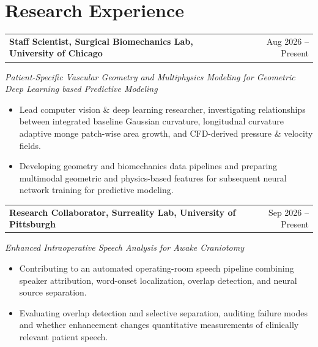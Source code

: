 \documentclass[letterpaper,10pt]{article}
\makeatletter
\newlength{\entrygap}
\newcommand{\cvProject}[2]{%
  \needspace{3\baselineskip}%
  \begin{tabularx}{\textwidth}{@{}X@{\hspace{0.5em}}r@{}}
    \textbf{#1} & {\small #2}
  \end{tabularx}\par\vspace{1pt}%
}
\newenvironment{cvitems}{%
  \begin{itemize}[leftmargin=0.17in,label=\textbullet,
    topsep=0pt,itemsep=2pt,parsep=0pt,partopsep=0pt]
  \normalsize
}{%
  \end{itemize}\vspace{\entrygap}%
}
\makeatother
\begin{document}
\section{Research Experience}
\cvProject{Staff Scientist\textnormal{, Surgical Biomechanics Lab, University of Chicago}}{Aug 2026 -- Present}
{\small\textit{Patient-Specific Vascular Geometry and Multiphysics Modeling for Geometric Deep Learning based Predictive Modeling}}\par\vspace{2pt}

\begin{cvitems}
  \item Lead computer vision \& deep learning researcher, investigating relationships between
        integrated baseline Gaussian curvature, longitudnal curvature adaptive monge patch-wise area
        growth, and CFD-derived pressure \& velocity fields.

  \item Developing geometry and biomechanics data pipelines and preparing multimodal geometric and physics-based features for subsequent neural network training for predictive modeling.
\end{cvitems}

\cvProject{Research Collaborator\textnormal{, Surreality Lab, University of Pittsburgh}}{Sep 2026 -- Present}
{\small\textit{Enhanced Intraoperative Speech Analysis for Awake Craniotomy}}\par\vspace{2pt}
\begin{cvitems}
  \item Contributing to an automated operating-room speech pipeline combining speaker attribution, word-onset localization, overlap detection, and neural source separation.
  \item Evaluating overlap detection and selective separation, auditing failure modes and whether enhancement changes quantitative measurements of clinically relevant patient speech.
\end{cvitems}
\end{document}
